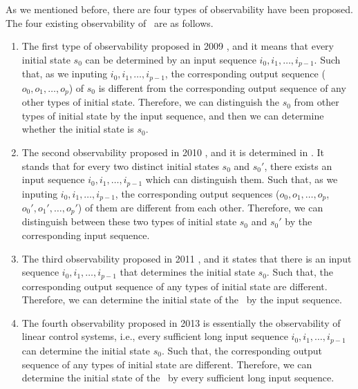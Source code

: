 As we mentioned before, there are four types of observability have been proposed. The four existing observability of \BCNs\ are as follows.
\begin{enumerate}
	\item The first type of observability proposed in 2009 \cite{cheng2009controllability}, and it means that every initial state $s_0$ can be determined by an input sequence $i_0, i_1,\ldots, i_{p-1}$. Such that, as we inputing $i_0, i_1,\ldots, i_{p-1}$, the corresponding output sequence ($o_0, o_1,\ldots, o_{p}$) of $s_0$ is different from the corresponding output sequence of any other types of initial state. Therefore, we can distinguish the $s_0$ from other types of initial state by the input sequence, and then we can determine whether the initial state is $s_0$.
	\item 
	The second observability proposed in 2010 \cite{Zhao2010Input}, and it is determined in \cite{Li2015Controllability}. It stands that for every two distinct initial states $s_0$ and $s_0'$, there exists an input sequence $i_0, i_1,\ldots, i_{p-1}$ which can distinguish them. Such that, as we inputing $i_0, i_1,\ldots, i_{p-1}$, the corresponding output sequences ($o_0, o_1,\ldots, o_{p}$, $o_0', o_1',\ldots, o_{p}'$) of them are different from each other. Therefore, we can distinguish between these two types of initial state $s_0$ and $s_0'$ by the corresponding input sequence.	
	\item The third observability proposed in 2011 \cite{Cheng2011Identification}, and it states that there is an input sequence $i_0, i_1,\ldots, i_{p-1}$ that determines the initial state $s_0$. Such that, the corresponding output sequence of any types of initial state are different. Therefore, we can determine the initial state of the \BCN\ by the input sequence.
	
	\item  The fourth observability proposed in 2013 \cite{Fornasini2013Observability} is essentially the observability of linear control systems, i.e., every sufficient long input sequence $i_0, i_1,\ldots, i_{p-1}$ can determine the initial state $s_0$. Such that, the corresponding output sequence of any types of initial state are different. Therefore, we can determine the initial state of the \BCN\ by every sufficient long input sequence.
\end{enumerate}
 
